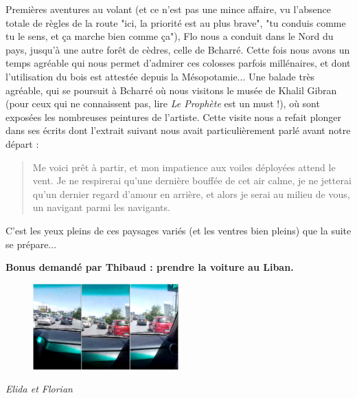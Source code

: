 Premières aventures au volant (et ce n'est pas une mince affaire, vu
l'absence totale de règles de la route "ici, la priorité est au plus
brave", "tu conduis comme tu le sens, et ça marche bien comme ça"), Flo
nous a conduit dans le Nord du pays, jusqu'à une autre forêt de cèdres,
celle de Bcharré. Cette fois nous avons un temps agréable qui nous
permet d'admirer ces colosses parfois millénaires, et dont l'utilisation
du bois est attestée depuis la Mésopotamie... Une balade très agréable,
qui se poursuit à Bcharré où nous visitons le musée de Khalil Gibran
(pour ceux qui ne connaissent pas, lire \emph{Le Prophète} est un must
!), où sont exposées les nombreuses peintures de l'artiste. Cette visite
nous a refait plonger dans ses écrits dont l'extrait suivant nous avait
particulièrement parlé avant notre départ :

\begin{quote}
Me voici prêt à partir, et mon impatience aux voiles déployées attend le
vent. Je ne respirerai qu'une dernière bouffée de cet air calme, je ne
jetterai qu'un dernier regard d'amour en arrière, et alors je serai au
milieu de vous, un navigant parmi les navigants.
\end{quote}

C'est les yeux pleins de ces paysages variés (et les ventres bien
pleins) que la suite se prépare...

\textbf{Bonus demandé par Thibaud : prendre la voiture au Liban.}

\begin{figure}[htbp]
\centering
\includegraphics[width=0.5\textwidth]{montage/liban.jpg}
\end{figure}


\emph{Elida et Florian}

